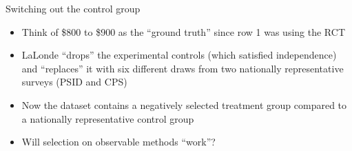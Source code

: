 \documentclass{beamer}
\begin{document}


\begin{frame}{Switching out the control group}

\begin{itemize}
\item Think of \$800 to \$900 as the ``ground truth'' since row 1 was using the RCT 
\item LaLonde ``drops'' the experimental controls (which satisfied independence) and ``replaces'' it with six different draws from two nationally representative surveys (PSID and CPS)
\item Now the dataset contains a negatively selected treatment group compared to a nationally representative control group
\item Will selection on observable methods ``work''?
\end{itemize}

\end{frame}


\end{document}
